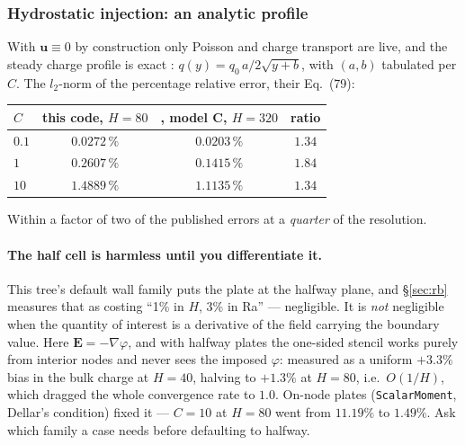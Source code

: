 \documentclass[11pt,a4paper]{article}
\newcommand{\code}[1]{\texttt{\small #1}}
\newcommand{\uu}{\bm{u}}
\begin{document}
\subsubsection{Hydrostatic injection: an analytic profile}
\label{sec:ehdhydro}

With $\uu\equiv0$ by construction only Poisson and charge transport are live, and
the steady charge profile is exact \cite{patnaik2025}:
$q(y) = q_0\,a/2\sqrt{y+b}$, with $(a,b)$ tabulated per $C$. The $l_2$-norm of
the percentage relative error, their Eq.~(79):

\begin{center}\small
\begin{tabular}{lccc}
\toprule
$C$ & this code, $H=80$ & \cite{patnaik2025}, model C, $H=320$ & ratio \\
\midrule
$0.1$ & $0.0272\,\%$ & $0.0203\,\%$ & $1.34$ \\
$1$   & $0.2607\,\%$ & $0.1415\,\%$ & $1.84$ \\
$10$  & $1.4889\,\%$ & $1.1135\,\%$ & $1.34$ \\
\bottomrule
\end{tabular}
\end{center}

\noindent Within a factor of two of the published errors at a \emph{quarter} of
the resolution.

\paragraph{The half cell is harmless until you differentiate it.}
This tree's default wall family puts the plate at the halfway plane, and
\S\ref{sec:rb} measures that as costing ``1\% in $H$, 3\% in Ra'' --- negligible.
It is \emph{not} negligible when the quantity of interest is a derivative of the
field carrying the boundary value. Here $\bm{E}=-\nabla\varphi$, and with halfway
plates the one-sided stencil works purely from interior nodes and never sees the
imposed $\varphi$: measured as a uniform $+3.3\%$ bias in the bulk charge at
$H=40$, halving to $+1.3\%$ at $H=80$, i.e.\ $O(1/H)$, which dragged the whole
convergence rate to $1.0$. On-node plates (\code{ScalarMoment}, Dellar's
condition) fixed it --- $C=10$ at $H=80$ went from $11.19\%$ to $1.49\%$. Ask
which family a case needs before defaulting to halfway.
\end{document}
